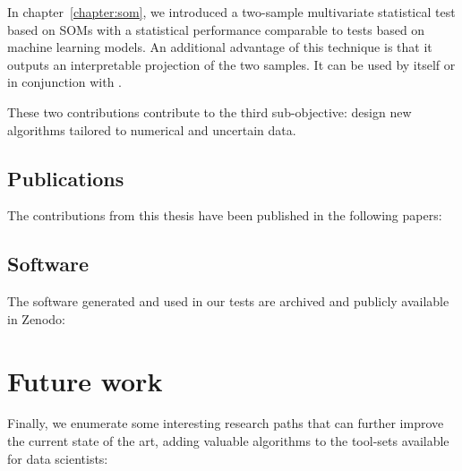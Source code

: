 In chapter~\ref{chapter:som}, we introduced a two-sample multivariate statistical test based on
\glspl{SOM} with a statistical performance comparable to tests based on machine learning models.
An additional advantage
of this technique is that it outputs an interpretable projection of the two samples. It can be used
by itself or in conjunction with \PresQ.

These two contributions contribute to the third sub-objective: design new algorithms tailored to numerical and
uncertain data.

\subsection{Publications}

The contributions from this thesis have been published in the following
papers:

\begin{refsection}
\nocite{Alvarez2019,Alvarez2021inference,AlvarezAyllonPresQ2022,Alvarez2022SOM}

\printbibliography[heading=none]
\end{refsection}

\subsection{Software}

The software generated and used in our tests are archived and publicly
available in Zenodo:

\begin{refsection}
\nocite{PresQ,SOMA}

\printbibliography[heading=none]
\end{refsection}

\section{Future work}
\label{sec:conclusions_future}

Finally, we enumerate some interesting research paths that can further improve
the current state of the art, adding valuable algorithms to the tool-sets
available for data scientists:

